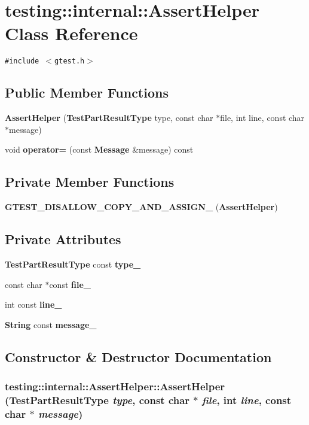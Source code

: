 \section{testing::internal::AssertHelper Class Reference}
\label{classtesting_1_1internal_1_1AssertHelper}
{\tt \#include $<$gtest.h$>$}

\subsection*{Public Member Functions}
\begin{CompactItemize}
\item 
{\bf AssertHelper} ({\bf TestPartResultType} type, const char $\ast$file, int line, const char $\ast$message)
\item 
void {\bf operator=} (const {\bf Message} \&message) const
\end{CompactItemize}
\subsection*{Private Member Functions}
\begin{CompactItemize}
\item 
{\bf GTEST\_\-DISALLOW\_\-COPY\_\-AND\_\-ASSIGN\_\-} ({\bf AssertHelper})
\end{CompactItemize}
\subsection*{Private Attributes}
\begin{CompactItemize}
\item 
{\bf TestPartResultType} const {\bf type\_\-}
\item 
const char $\ast$const {\bf file\_\-}
\item 
int const {\bf line\_\-}
\item 
{\bf String} const {\bf message\_\-}
\end{CompactItemize}


\subsection{Constructor \& Destructor Documentation}
\subsubsection{\setlength{\rightskip}{0pt plus 5cm}testing::internal::AssertHelper::AssertHelper ({\bf TestPartResultType} {\em type}, const char $\ast$ {\em file}, int {\em line}, const char $\ast$ {\em message})}\label{classtesting_1_1internal_1_1AssertHelper_f28f11ad1b22a81480325011929068bb}




